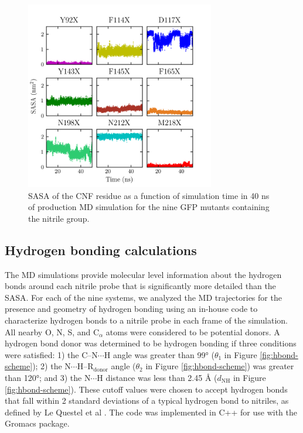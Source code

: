 \begin{figure}
    \center
    \includegraphics[width=3.25in]{figures-gfp-hbond/sasa_v_time.png}
    \caption{SASA of the CNF residue as a function of simulation time in 40 ns of production MD simulation for the nine GFP mutants containing the nitrile group.}
    \label{fig:hbond-sasa}
\end{figure}

\subsection{Hydrogen bonding calculations}

The MD simulations provide molecular level information about the hydrogen bonds around each nitrile probe that is significantly more detailed than the SASA.
For each of the nine systems, we analyzed the MD trajectories for the presence and geometry of hydrogen bonding using an in-house code to characterize hydrogen bonds to a nitrile probe in each frame of the simulation.
All nearby O, N, S, and C$_{\alpha}$ atoms were considered to be potential donors.
A hydrogen bond donor was determined to be hydrogen bonding if three conditions were satisfied: 1) the C--N$\cdots$H angle was greater than \ang{99} ($\theta_1$ in Figure \ref{fig:hbond-scheme}); 2) the N$\cdots$H--R$_{\text{donor}}$ angle ($\theta_2$ in Figure \ref{fig:hbond-scheme}) was greater than \ang{120}; and 3) the N$\cdots$H distance was less than 2.45 \si{\angstrom} ($d_{\text{NH}}$ in Figure \ref{fig:hbond-scheme}).
These cutoff values were chosen to accept hydrogen bonds that fall within 2 standard deviations of a typical hydrogen bond to nitriles, as defined by Le Questel et al \cite{LeQuestel2000}.
The code was implemented in C++ for use with the Gromacs package.  

